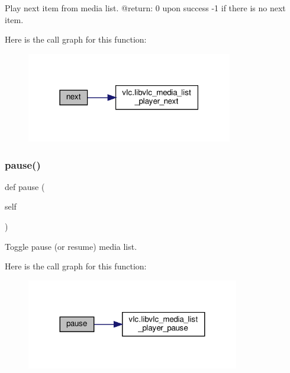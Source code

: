 \begin{DoxyVerb}Play next item from media list.
@return: 0 upon success -1 if there is no next item.
\end{DoxyVerb}
 Here is the call graph for this function\+:
\nopagebreak
\begin{figure}[H]
\begin{center}
\leavevmode
\includegraphics[width=255pt]{classvlc_1_1_media_list_player_a9dbee9488c9365114fed347d1a8846f1_cgraph}
\end{center}
\end{figure}
\mbox{\label{classvlc_1_1_media_list_player_aee7a4c35e3232c131ff62b5866eb4a16}} 
\subsubsection{\texorpdfstring{pause()}{pause()}}
{\footnotesize\ttfamily def pause (\begin{DoxyParamCaption}\item[{}]{self }\end{DoxyParamCaption})}

\begin{DoxyVerb}Toggle pause (or resume) media list.
\end{DoxyVerb}
 Here is the call graph for this function\+:
\nopagebreak
\begin{figure}[H]
\begin{center}
\leavevmode
\includegraphics[width=263pt]{classvlc_1_1_media_list_player_aee7a4c35e3232c131ff62b5866eb4a16_cgraph}
\end{center}
\end{figure}
\mbox{\label{classvlc_1_1_media_list_player_a9942567d8012950a20b0798b4203bb57}} 
